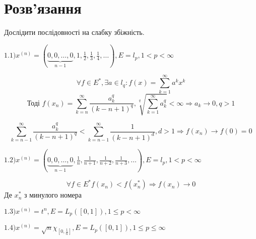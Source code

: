 \section*{Розв'язання}


\begin{tcolorbox}[title=Завдлання 1]
    Дослідити послідовності на слабку збіжність.

    $
    1.1) x^{(n)}=(\underbrace{0,0, \ldots, 0}_{n-1}, 1, \frac{1}{2},
    \frac{1}{3}, \frac{1}{4}, \ldots), E=l_{p}, 1<p<\infty $


    $$\forall f \in E^*, \exists a \in l_q: f(x) = 
    \sum_{k=1}^\infty a^k x^k$$
    $$\text{Тоді } f(x_n) = \sum_{k = n}^{\infty} \frac{a_k^q}{(k - n + 1)^q},
    \sqrt[q]{\sum_{k=1}^{\infty} a_k^q} < \infty \Rightarrow a_k \rightarrow 0, 
    q > 1$$

    $$ \sum_{k=n-1}^{\infty}  \frac{a_k^q}{(k - n + 1)^q} < 
    \sum_{k=n-1}^{\infty}  \frac{1}{(k - n + 1)^d}, d>1 \Rightarrow f(x_n) \rightarrow
    f(0) = 0 $$


    $
    1.2) x^{(n)}=(\underbrace{0,0, \ldots, 0}_{n-1}, \frac{1}{n}, 
    \frac{1}{n+1}, \frac{1}{n+2}, \frac{1}{n+3}, \ldots), E=l_{p}, 1<p<\infty
    $

    $$\forall f \in E^* f(x_n) < f(x_n^*) 
    \Rightarrow f(x_n) \rightarrow 0$$
    Де $x_n^*$ з минулого номера 

    $
    1.3) x^{(n)}=t^{n}, E=L_{p}([0,1]), 1 \leq p<\infty
    $
    




    $
    1.4) x^{(n)}=\sqrt{n} \chi_{[0, \frac{1}{n}]}, E=L_{p}([0,1]), 1 \leq p \leq \infty
    $

\end{tcolorbox}

\begin{tcolorbox}
\end{tcolorbox}